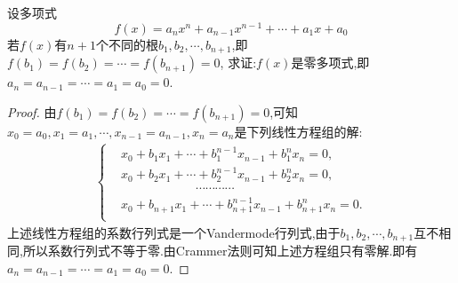 \documentclass[lang=cn,newtx,10pt,scheme=chinese]{elegantbook}
\begin{document}
\begin{proposition}\label{proposition:多项式根的有限性}
设多项式
\[
f(x)=a_nx^n + a_{n - 1}x^{n - 1}+\cdots+a_1x + a_0
\]
若\(f(x)\)有\(n + 1\)个不同的根\(b_1,b_2,\cdots,b_{n+1}\),即\(f(b_1)=f(b_2)=\cdots=f(b_{n+1})=0\),
求证:\(f(x)\)是零多项式,即\(a_n=a_{n - 1}=\cdots=a_1=a_0 = 0\).
\end{proposition}
\begin{proof}
由\(f(b_1)=f(b_2)=\cdots=f(b_{n+1})=0\),可知$x_0=a_0,x_1=a_1,\cdots ,x_{n-1}=a_{n-1},x_n=a_n$是下列线性方程组的解:
\begin{align*}
\left\{ \begin{aligned}
&x_0+b_1x_1+\cdots +b_{1}^{n-1}x_{n-1}+b_{1}^{n}x_n=0,\\
&x_0+b_2x_1+\cdots +b_{2}^{n-1}x_{n-1}+b_{2}^{n}x_n=0,\\
&\qquad \qquad \qquad \cdots \cdots \cdots \cdots\\
&x_0+b_{n+1}x_1+\cdots +b_{n+1}^{n-1}x_{n-1}+b_{n+1}^{n}x_n=0.\\
\end{aligned} \right. 
\end{align*}
上述线性方程组的系数行列式是一个Vandermode行列式,由于$b_1,b_2,\cdots,b_{n+1}$互不相同,所以系数行列式不等于零.由Crammer法则可知上述方程组只有零解.即有$a_n=a_{n - 1}=\cdots=a_1=a_0 = 0$.
\end{proof}
\end{document}
